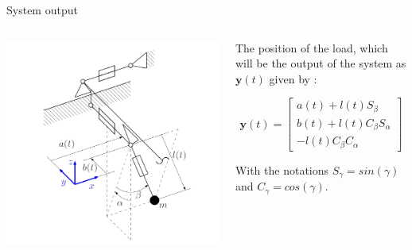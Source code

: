 \begin{frame}{System output}
\begin{columns}[T]
\begin{column}{0.5\textwidth}
        \centering
        \includegraphics[width=\linewidth]{imgs/Crane/3DimCranSchem.PNG}
        \label{fig:Schematics of three dimensional overhead crane}
\end{column}
    
\begin{column}{0.5\textwidth}
    The position of the load, which will be the output of the system as \(\textbf{y}(t)\) given by :

 \vspace{1em} %
 
\begin{equation}
    \textbf{y}(t) = \begin{bmatrix}
        a(t) + l(t)S_\beta \\
    b(t) + l(t)C_\beta S_\alpha \\
    -l(t)C_\beta C_\alpha
    \end{bmatrix}
\end{equation}

 \vspace{1em} %
 

With the notations \(S_\gamma = sin(\gamma)\) and \(C_\gamma = cos(\gamma)\).
\end{column}

\end{columns}

\end{frame}

